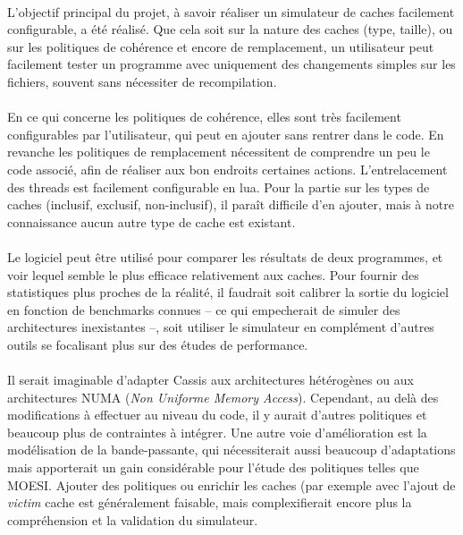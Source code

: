 \paragraph{}
L'objectif principal du projet, à savoir réaliser un simulateur de caches facilement configurable, a été réalisé. Que cela soit sur la nature des caches (type, taille), ou sur les politiques de cohérence et encore de remplacement, un utilisateur peut facilement tester un programme avec uniquement des changements simples sur les fichiers, souvent sans nécessiter de recompilation.

\paragraph{}
En ce qui concerne les politiques de cohérence, elles sont très facilement configurables par l'utilisateur, qui peut en ajouter sans rentrer dans le code. En revanche les politiques de remplacement nécessitent de comprendre un peu le code associé, afin de réaliser aux bon endroits certaines actions. L'entrelacement des threads est facilement configurable en lua. Pour la partie sur les types de caches (inclusif, exclusif, non-inclusif), il paraît difficile d'en ajouter, mais à notre connaissance aucun autre type de cache est existant.

\paragraph{}
Le logiciel peut être utilisé pour comparer les résultats de deux programmes, et voir lequel semble le plus efficace relativement aux caches. Pour fournir des statistiques plus proches de la réalité, il faudrait soit calibrer la sortie du logiciel en fonction de benchmarks connues -- ce qui empecherait de simuler des architectures inexistantes --, soit utiliser le simulateur en complément d'autres outils se focalisant plus sur des études de performance.

\paragraph{}
Il serait imaginable d'adapter \textsf{Cassis} aux architectures hétérogènes ou aux architectures NUMA (\emph{Non Uniforme Memory Access}). Cependant, au delà des modifications à effectuer au niveau du code, il y aurait d'autres politiques et beaucoup plus de contraintes à intégrer. Une autre voie d'amélioration est la modélisation de la bande-passante, qui nécessiterait aussi beaucoup d'adaptations mais apporterait un gain considérable pour l'étude des politiques telles que MOESI. Ajouter des politiques ou enrichir les caches (par exemple avec l'ajout de \emph{victim} cache est généralement faisable, mais complexifierait encore plus la compréhension et la validation du simulateur.

